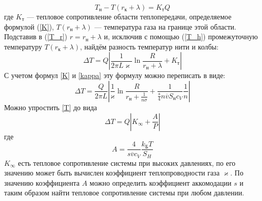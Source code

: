\documentclass[12pt]{article}
\begin{document}
        \begin{equation}\label{T_h}
            T_{\text{н}} - T(r_{\text{к}} + \lambda) = K_{\text{т}}Q
        \end{equation}
        где $K_{\text{т}}$ — тепловое сопротивление области теплопередачи, определяемое формулой (\ref{K}), $T(r_{\text{н}} + \lambda)$ — температура газа на границе этой области. Подставив
        в (\ref{T_r}) $r = r_{\text{н}} + \lambda$ и, исключив с помощью (\ref{T_h}) промежуточную температуру $T(r_{\text{к}} + \lambda)$, найдём разность температур нити и колбы:
        \begin{equation}
            \Delta T = Q \left|\frac{1}{2\pi L \varkappa}\ln\frac{R}{r_{\text{н}}+\lambda} + K_{\text{т}} \right|
        \end{equation}
        С учетом формул \ref{K} и \ref{kappa} эту формулу можно переписать в виде:
        \begin{equation}\label{T}
            \Delta T = \frac{Q}{2\pi L}\left| \frac{1}{\varkappa}\ln\frac{R}{r_{\text{н}}+\frac{1}{n\sigma}} +\frac{1}{\frac{s}{4} n \overline{v} S_{\text{н}}c_V} \frac{1}{n}\right|
        \end{equation}
        Можно упростить \ref{T} до вида
        \begin{equation}
            \Delta T = Q \left|K_{\infty} + \frac{A}{P}\right|
        \end{equation}
        где
        \[
            A = \frac{4}{s\overline{v}c_V}\frac{k_{\text{Б}}T}{S_H}
        \]
        $K_{\infty}$ есть тепловое сопротивление системы при высоких давлениях,
        по его значению может быть вычислен коэффициент теплопроводности газа $\varkappa$. По значению коэффициента $A$ можно определить коэффициент
        аккомодации $s$ и таким образом найти тепловое сопротивление системы при любом давлении.
\end{document}
